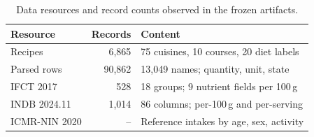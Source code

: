 \begin{table}[t]
\caption{Data resources and record counts observed in the frozen artifacts.}
\label{tab:datasets}
\centering
\footnotesize
\setlength{\tabcolsep}{3.5pt}
\begin{tabular}{@{}lrp{3.0cm}@{}}
\toprule
\textbf{Resource} & \textbf{Records} & \textbf{Content} \\
\midrule
Recipes       & 6{,}865 & 75 cuisines, 10 courses, 20 diet labels \\
Parsed rows   & 90{,}862 & 13{,}049 names; quantity, unit, state \\
IFCT 2017     & 528 & 18 groups; 9 nutrient fields per 100\,g \\
INDB 2024.11  & 1{,}014 & 86 columns; per-100\,g and per-serving \\
ICMR-NIN 2020 & -- & Reference intakes by age, sex, activity \\
\bottomrule
\end{tabular}
\end{table}
